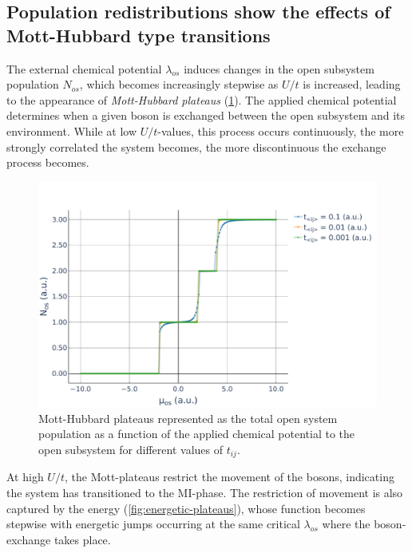 \documentclass[twoside,twocolumn,9pt]{article}
\begin{document}
\subsection{Population redistributions show the effects of Mott-Hubbard type transitions}
The external chemical potential $\lambda_{os}$ induces changes in the open subsystem population $N_{os}$, which becomes increasingly stepwise as $U/t$ is increased, leading to the appearance of \emph{Mott-Hubbard plateaus} (\cref{fig:Mott-Hubbard}). The applied chemical potential determines when a given boson is exchanged between the open subsystem and its environment. While at low $U/t$-values, this process occurs continuously, the more strongly correlated the system becomes, the more discontinuous the exchange process becomes. 
\begin{center}
    \begin{figure}
        \includegraphics[width=\linewidth]{../code/figures/BH-3in3-NvsMu.pdf}
        \caption{Mott-Hubbard plateaus represented as the total open system population as a function of the applied chemical potential to the open subsystem for different values of $t_{ij}$.}
        \label{fig:Mott-Hubbard}
    \end{figure}
\end{center}
At high $U/t$, the Mott-plateaus restrict the movement of the bosons, indicating the system has transitioned to the MI-phase. The restriction of movement is also captured by the energy (\cref{fig:energetic-plateaus}), whose function becomes stepwise with energetic jumps occurring at the same critical $\lambda_{os}$ where the boson-exchange takes place.
\end{document}
